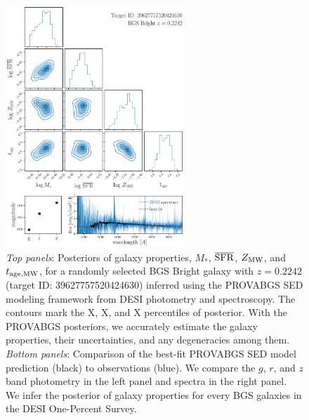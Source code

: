 \begin{figure}
\begin{center}
    \includegraphics[width=0.6\textwidth]{figs/provabgs_posterior.pdf}
    \caption{
        {\em Top panels}: 
        Posteriors of galaxy properties, $M_*$, $\overline{\rm SFR}$, 
        $Z_{\rm MW}$, and $t_{\rm age, MW}$, for a randomly selected BGS 
        Bright galaxy with $z=0.2242$ (target ID: 39627757520424630) inferred
        using the PROVABGS SED modeling framework from DESI photometry and
        spectroscopy. 
        The contours mark the {\color{red} X, X, and X} percentiles of
        posterior. 
        With the PROVABGS posteriors, we accurately estimate the galaxy
        properties, their uncertainties, and any degeneracies among them. 
        {\em Bottom panels}: 
        Comparison of the best-fit PROVABGS SED model prediction (black) to
        observations (blue). 
        We compare the $g$, $r$, and $z$ band photometry in the left panel and 
        spectra in the right panel. 
        We infer the posterior of galaxy properties for every BGS galaxies in
        the DESI One-Percent Survey.
    }\label{fig:posterior}
\end{center}
\end{figure}


